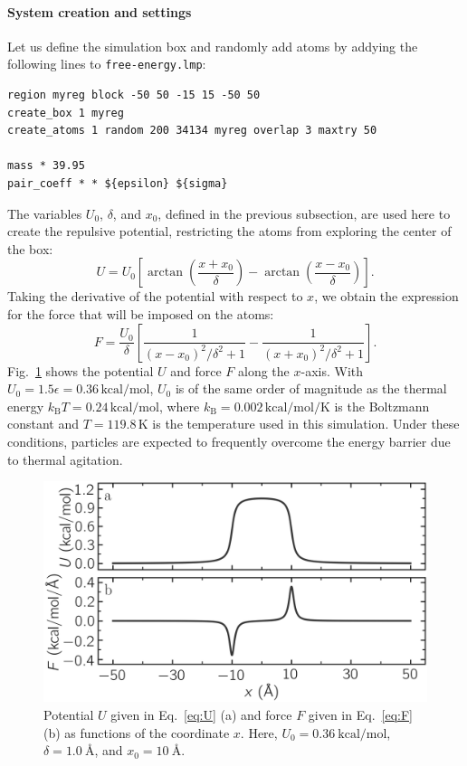 \documentclass[9pt,tutorial]{livecoms}
\newcommand{\flecmd}[1]{\textcolor{command}{\texttt{#1}}} %
\begin{document}
\paragraph{System creation and settings}

Let us define the simulation box and randomly add atoms by addying the
following lines to \flecmd{free-energy.lmp}:
\begin{lstlisting}
region myreg block -50 50 -15 15 -50 50
create_box 1 myreg
create_atoms 1 random 200 34134 myreg overlap 3 maxtry 50

mass * 39.95
pair_coeff * * ${epsilon} ${sigma}
\end{lstlisting}

The variables $U_0$, $\delta$, and $x_0$, defined in the previous subsection, are
used here to create the repulsive potential, restricting the atoms from exploring
the center of the box:
\begin{equation}
U = U_0 \left[ \arctan \left( \dfrac{x+x_0}{\delta} \right)
- \arctan \left(\dfrac{x-x_0}{\delta} \right) \right].
\label{eq:U}
\end{equation}
Taking the derivative of the potential with respect to $x$, we obtain the expression
for the force that will be imposed on the atoms:
\begin{equation}
F = \dfrac{U_0}{\delta} \left[ \dfrac{1}{(x-x_0)^2/\delta^2+1}
- \dfrac{1}{(x+x_0)^2/\delta^2+1} \right].
\label{eq:F}
\end{equation}
Fig.~\ref{fig:potential} shows the potential $U$ and force $F$ along the $x$-axis.
With $U_0 = 1.5 \epsilon = 0.36\,\text{kcal/mol}$, $U_0$ is of the same order of magnitude as the
thermal energy $k_\text{B} T = 0.24\,\text{kcal/mol}$, where $k_\text{B} = 0.002\,\text{kcal/mol/K}$
is the Boltzmann constant and $T = 119.8\,\text{K}$ is the temperature
used in this simulation.  Under these conditions, particles are expected to
frequently overcome the energy barrier due to thermal agitation.

\begin{figure}
\centering
\includegraphics[width=\linewidth]{US-potential}
\caption{Potential $U$ given in Eq.~\eqref{eq:U} (a) and force $F$ given in
Eq.~\eqref{eq:F} (b) as functions of the coordinate $x$. Here,
$U_0 = 0.36~\text{kcal/mol}$, $\delta = 1.0~\text{\AA{}}$, and $x_0 = 10~\text{\AA{}}$.}
\label{fig:potential}
\end{figure}
\end{document}
